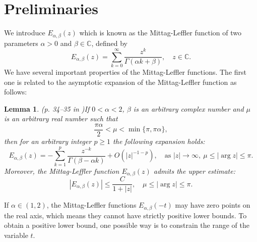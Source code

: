 \documentclass[11pt]{article}
\newtheorem{lemma}{Lemma}[section]
\numberwithin{equation}{section}
\begin{document}
\section{Preliminaries}\label{sec-pre}
We introduce $E_{\alpha,\beta}(z)$ which is known as the Mittag-Leffler function of two parameters $\alpha>0$ and $\beta\in\mathbb C$, defined by
\begin{equation*}
  E_{\alpha,\beta}(z) = \sum_{k=0}^{\infty} \frac{z^k}{\Gamma(\alpha k + \beta)}, \quad z \in \mathbb{C}.
\end{equation*}
We have several important properties of the Mittag-Leffler functions.  The first one is related to the asymptotic expansion of the Mittag-Leffler function as follows:
\begin{lemma}(p. 34--35 in \cite{podlubny1998fract})\label{lem-ml-asymp}
If $0<\alpha<2$, $\beta$ is an arbitrary complex number and $\mu$ is an arbitrary real number such that
$$
  \frac{\pi\alpha}2 <\mu<\min\{\pi,\pi\alpha\},
$$
then for an arbitrary integer $p\ge1$ the following expansion holds:
$$
  E_{\alpha,\beta}(z)
= -\sum_{k=1}^p \frac{z^{-k}}{\Gamma(\beta-\alpha k)} +O(|z|^{-1-p}),\quad \text{as }  |z|\to\infty, \ \mu \le |\arg z|\le\pi.
$$
Moreover, the Mittag-Leffler function $E_{\alpha,\beta}(z)$ admits the upper estimate:
$$
|E_{\alpha,\beta}(z)| \le \frac{C}{1+|z|} ,\quad  \mu\le |\arg z|\le\pi.
$$
\end{lemma}
If $\alpha\in(1,2)$, the Mittag-Leffler functions $E_{\alpha,\beta}(-t)$ may have zero points on the real axis, which means they cannot have strictly positive lower bounds. To obtain a positive lower bound, one possible way is to constrain the range of the variable $t$.
\end{document}
